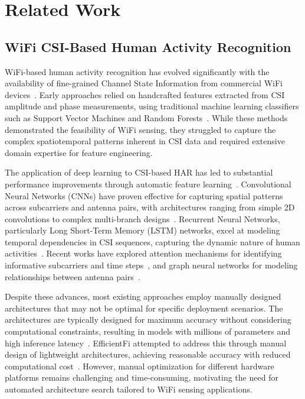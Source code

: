 \documentclass[journal]{IEEEtran}
\begin{document}
\section{Related Work}

\subsection{WiFi CSI-Based Human Activity Recognition}

WiFi-based human activity recognition has evolved significantly with the availability of fine-grained Channel State Information from commercial WiFi devices~\cite{csi2015survey}. Early approaches relied on handcrafted features extracted from CSI amplitude and phase measurements, using traditional machine learning classifiers such as Support Vector Machines and Random Forests~\cite{handcrafted2016}. While these methods demonstrated the feasibility of WiFi sensing, they struggled to capture the complex spatiotemporal patterns inherent in CSI data and required extensive domain expertise for feature engineering.

The application of deep learning to CSI-based HAR has led to substantial performance improvements through automatic feature learning~\cite{deep2020csi}. Convolutional Neural Networks (CNNs) have proven effective for capturing spatial patterns across subcarriers and antenna pairs, with architectures ranging from simple 2D convolutions to complex multi-branch designs~\cite{cnn2021csi}. Recurrent Neural Networks, particularly Long Short-Term Memory (LSTM) networks, excel at modeling temporal dependencies in CSI sequences, capturing the dynamic nature of human activities~\cite{lstm2022har}. Recent works have explored attention mechanisms for identifying informative subcarriers and time steps~\cite{attention2023csi}, and graph neural networks for modeling relationships between antenna pairs~\cite{gnn2024wifi}.

Despite these advances, most existing approaches employ manually designed architectures that may not be optimal for specific deployment scenarios. The architectures are typically designed for maximum accuracy without considering computational constraints, resulting in models with millions of parameters and high inference latency~\cite{complexity2023issue}. EfficientFi attempted to address this through manual design of lightweight architectures, achieving reasonable accuracy with reduced computational cost~\cite{efficientfi2022}. However, manual optimization for different hardware platforms remains challenging and time-consuming, motivating the need for automated architecture search tailored to WiFi sensing applications.
\end{document}

